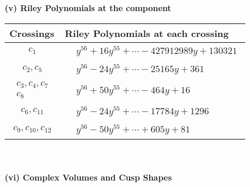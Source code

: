 \documentclass[1p]{elsarticle_modified}
\theoremstyle{definition}
\begin{document}
\newpage\renewcommand{\arraystretch}{1}
\flushleft \textbf{(v) Riley Polynomials at the component}\newline \\
\begin{tabular}{m{50pt}|m{274pt}}
Crossings & \hspace{64pt}Riley Polynomials at each crossing \\
\hline $$\begin{aligned}c_{1}\end{aligned}$$&$\begin{aligned}
&y^{56}+16 y^{55}+\cdots-427912989 y+130321
\end{aligned}$\\
\hline $$\begin{aligned}c_{2},c_{5}\end{aligned}$$&$\begin{aligned}
&y^{56}-24 y^{55}+\cdots-25165 y+361
\end{aligned}$\\
\hline $$\begin{aligned}c_{3},c_{4},c_{7}\\c_{8}\end{aligned}$$&$\begin{aligned}
&y^{56}+50 y^{55}+\cdots-464 y+16
\end{aligned}$\\
\hline $$\begin{aligned}c_{6},c_{11}\end{aligned}$$&$\begin{aligned}
&y^{56}-24 y^{55}+\cdots-17784 y+1296
\end{aligned}$\\
\hline $$\begin{aligned}c_{9},c_{10},c_{12}\end{aligned}$$&$\begin{aligned}
&y^{56}-50 y^{55}+\cdots+605 y+81
\end{aligned}$\\
\hline
\end{tabular}\\~\\
\newpage\flushleft \textbf{(vi) Complex Volumes and Cusp Shapes}
\end{document}
